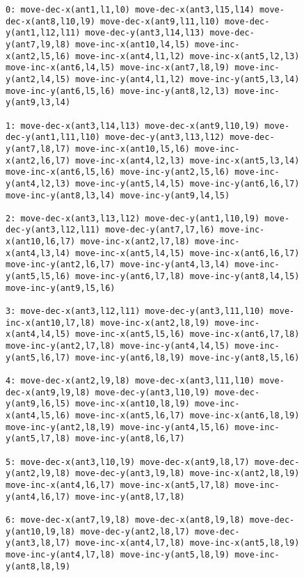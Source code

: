 \documentclass[letterpaper]{article} %
\begin{document}
\begin{figure}
\begin{scriptsize}
\begin{verbatim}
0: move-dec-x(ant1,l1,l0) move-dec-x(ant3,l15,l14) move-dec-x(ant8,l10,l9) move-dec-x(ant9,l11,l10) move-dec-y(ant1,l12,l11) move-dec-y(ant3,l14,l13) move-dec-y(ant7,l9,l8) move-inc-x(ant10,l4,l5) move-inc-x(ant2,l5,l6) move-inc-x(ant4,l1,l2) move-inc-x(ant5,l2,l3) move-inc-x(ant6,l4,l5) move-inc-x(ant7,l8,l9) move-inc-y(ant2,l4,l5) move-inc-y(ant4,l1,l2) move-inc-y(ant5,l3,l4) move-inc-y(ant6,l5,l6) move-inc-y(ant8,l2,l3) move-inc-y(ant9,l3,l4)

1: move-dec-x(ant3,l14,l13) move-dec-x(ant9,l10,l9) move-dec-y(ant1,l11,l10) move-dec-y(ant3,l13,l12) move-dec-y(ant7,l8,l7) move-inc-x(ant10,l5,l6) move-inc-x(ant2,l6,l7) move-inc-x(ant4,l2,l3) move-inc-x(ant5,l3,l4) move-inc-x(ant6,l5,l6) move-inc-y(ant2,l5,l6) move-inc-y(ant4,l2,l3) move-inc-y(ant5,l4,l5) move-inc-y(ant6,l6,l7) move-inc-y(ant8,l3,l4) move-inc-y(ant9,l4,l5)

2: move-dec-x(ant3,l13,l12) move-dec-y(ant1,l10,l9) move-dec-y(ant3,l12,l11) move-dec-y(ant7,l7,l6) move-inc-x(ant10,l6,l7) move-inc-x(ant2,l7,l8) move-inc-x(ant4,l3,l4) move-inc-x(ant5,l4,l5) move-inc-x(ant6,l6,l7) move-inc-y(ant2,l6,l7) move-inc-y(ant4,l3,l4) move-inc-y(ant5,l5,l6) move-inc-y(ant6,l7,l8) move-inc-y(ant8,l4,l5) move-inc-y(ant9,l5,l6)

3: move-dec-x(ant3,l12,l11) move-dec-y(ant3,l11,l10) move-inc-x(ant10,l7,l8) move-inc-x(ant2,l8,l9) move-inc-x(ant4,l4,l5) move-inc-x(ant5,l5,l6) move-inc-x(ant6,l7,l8) move-inc-y(ant2,l7,l8) move-inc-y(ant4,l4,l5) move-inc-y(ant5,l6,l7) move-inc-y(ant6,l8,l9) move-inc-y(ant8,l5,l6)

4: move-dec-x(ant2,l9,l8) move-dec-x(ant3,l11,l10) move-dec-x(ant9,l9,l8) move-dec-y(ant3,l10,l9) move-dec-y(ant9,l6,l5) move-inc-x(ant10,l8,l9) move-inc-x(ant4,l5,l6) move-inc-x(ant5,l6,l7) move-inc-x(ant6,l8,l9) move-inc-y(ant2,l8,l9) move-inc-y(ant4,l5,l6) move-inc-y(ant5,l7,l8) move-inc-y(ant8,l6,l7)

5: move-dec-x(ant3,l10,l9) move-dec-x(ant9,l8,l7) move-dec-y(ant2,l9,l8) move-dec-y(ant3,l9,l8) move-inc-x(ant2,l8,l9) move-inc-x(ant4,l6,l7) move-inc-x(ant5,l7,l8) move-inc-y(ant4,l6,l7) move-inc-y(ant8,l7,l8)

6: move-dec-x(ant7,l9,l8) move-dec-x(ant8,l9,l8) move-dec-y(ant10,l9,l8) move-dec-y(ant2,l8,l7) move-dec-y(ant3,l8,l7) move-inc-x(ant4,l7,l8) move-inc-x(ant5,l8,l9) move-inc-y(ant4,l7,l8) move-inc-y(ant5,l8,l9) move-inc-y(ant8,l8,l9)


\end{verbatim}
\end{scriptsize}
\end{figure}
\end{document}
